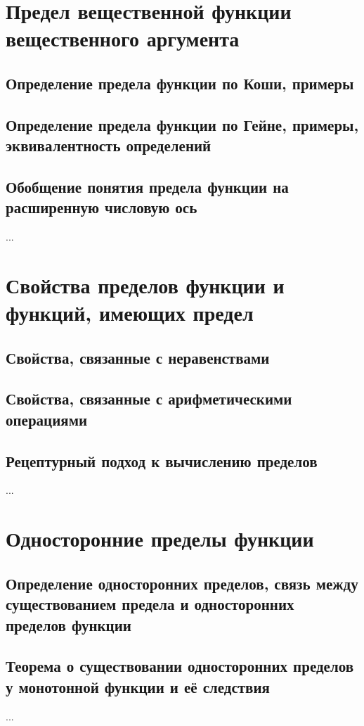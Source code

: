\section{Предел вещественной функции вещественного аргумента}
\subsection{Определение предела функции по Коши, примеры}

\subsection{Определение предела функции по Гейне, примеры, эквивалентность определений}
\subsection{Обобщение понятия предела функции на расширенную числовую ось}
...

\section{Свойства пределов функции и функций, имеющих предел}
\subsection{Свойства, связанные с неравенствами}
\subsection{Свойства, связанные с арифметическими  операциями}
\subsection{Рецептурный подход к вычислению пределов}

...

\section{Односторонние пределы функции}
\subsection{Определение односторонних пределов, связь между существованием предела и односторонних пределов функции}
\subsection{Теорема о существовании односторонних пределов у монотонной функции и её следствия}
...

